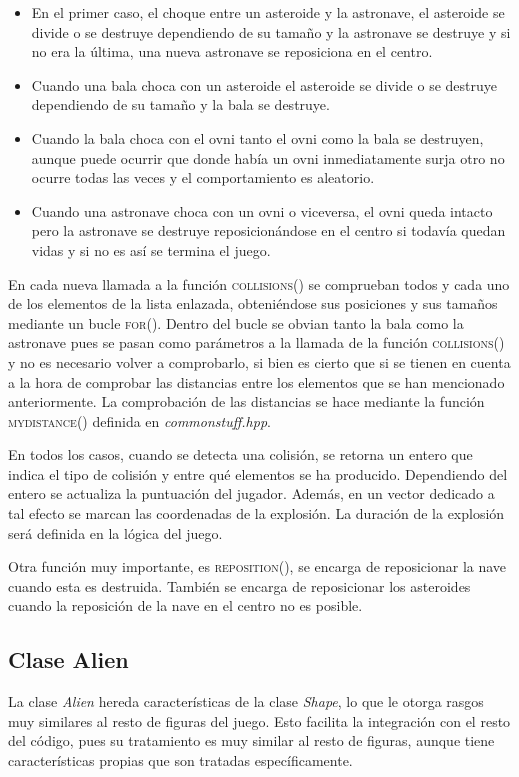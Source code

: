 \begin{itemize}
    \item En el primer caso, el choque entre un asteroide y la astronave, el asteroide se divide o se destruye dependiendo de su tamaño y la astronave se destruye y si no era la última, una nueva astronave se reposiciona en el centro.
    \item Cuando una bala choca con un asteroide el asteroide se divide o se destruye dependiendo de su tamaño y la bala se destruye.
    \item Cuando la bala choca con el ovni tanto el ovni como la bala se destruyen, aunque puede ocurrir que donde había un ovni inmediatamente surja otro no ocurre todas las veces y el comportamiento es aleatorio.
    \item Cuando una astronave choca con un ovni o viceversa, el ovni queda intacto pero la astronave se destruye reposicionándose en el centro si todavía quedan vidas y si no es así se termina el juego.
\end{itemize}

En cada nueva llamada a la función \textsc{collisions()} se comprueban todos y cada uno de los elementos de la lista enlazada, obteniéndose sus posiciones y sus tamaños mediante un bucle \textsc{for()}. Dentro del bucle se obvian tanto la bala como la astronave pues se pasan como parámetros a la llamada de la función \textsc{collisions()} y no es necesario volver a comprobarlo, si bien es cierto que si se tienen en cuenta a la hora de comprobar las distancias entre los elementos que se han mencionado anteriormente. La comprobación de las distancias se hace mediante la función \textsc{mydistance()} definida en \emph{commonstuff.hpp}.

En todos los casos, cuando se detecta una colisión, se retorna un entero que indica el tipo de colisión y entre qué elementos se ha producido. Dependiendo del entero se actualiza la puntuación del jugador.  Además, en un vector dedicado a tal efecto se marcan las coordenadas de la explosión. La duración de la explosión será definida en la lógica del juego.

Otra función muy importante, es \textsc{reposition()}, se encarga de reposicionar la nave cuando esta es destruida. También se encarga de reposicionar los asteroides cuando la reposición de la nave en el centro no es posible.

\subsection{Clase Alien}
La clase \emph{Alien} hereda características de la clase \emph{Shape}, lo que le otorga rasgos muy similares al resto de figuras del juego. 
Esto facilita la integración con el resto del código, pues su tratamiento es muy similar al resto de figuras, aunque tiene características propias que son tratadas específicamente. 

